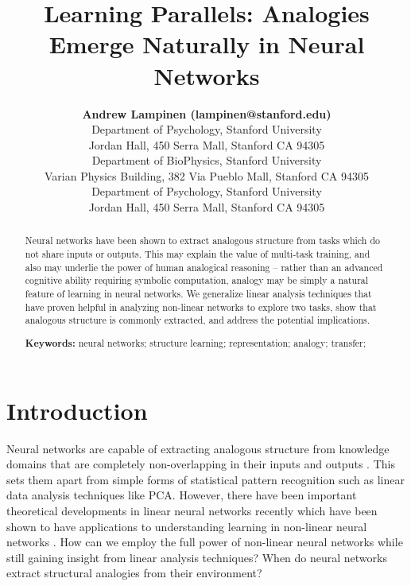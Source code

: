 \documentclass[10pt,letterpaper]{article}
\title{Learning Parallels: Analogies Emerge Naturally in Neural Networks}
\author{{\large \bf Andrew Lampinen (lampinen@stanford.edu)} \\
  Department of Psychology, Stanford University \\
  Jordan Hall, 450 Serra Mall, Stanford CA 94305 
  \AND {\large \bf Shaw Hsu (cshawhsu@stanford.edu)} \\
  Department of BioPhysics, Stanford University \\
  Varian Physics Building, 382 Via Pueblo Mall, Stanford CA 94305
  \AND {\large \bf James L. McClelland (mcclelland@stanford.edu)} \\
  Department of Psychology, Stanford University \\
  Jordan Hall, 450 Serra Mall, Stanford CA 94305}
\begin{document}
\maketitle


\begin{abstract}
Neural networks have been shown to extract analogous structure from tasks which do not share inputs or outputs. This may explain the value of multi-task training, and also may underlie the power of human analogical reasoning -- rather than an advanced cognitive ability requiring symbolic computation, analogy may be simply a natural feature of learning in neural networks. We generalize linear analysis techniques that have proven helpful in analyzing non-linear networks to explore two tasks, show that analogous structure is commonly extracted, and address the potential implications. 

\textbf{Keywords:} 
neural networks; structure learning; representation; analogy; transfer; 
\end{abstract}


\section{Introduction}
Neural networks are capable of extracting analogous structure from knowledge domains that are completely non-overlapping in their inputs and outputs \citep{Hinton1986,Rogers2008}. This sets them apart from simple forms of statistical pattern recognition \citep{Rogers2008} such as linear data analysis techniques like PCA. However, there have been important theoretical developments in linear neural networks recently which have been shown to have applications to understanding learning in non-linear neural networks \citep{Saxe2013}. How can we employ the full power of non-linear neural networks while still gaining insight from linear analysis techniques? When do neural networks extract structural analogies from their environment?\par 
\end{document}
